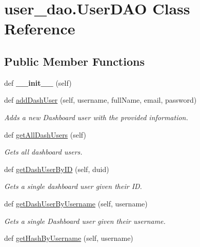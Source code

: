 \hypertarget{classuser__dao_1_1_user_d_a_o}{}\section{user\+\_\+dao.\+User\+D\+AO Class Reference}
\label{classuser__dao_1_1_user_d_a_o}
\subsection*{Public Member Functions}
\begin{DoxyCompactItemize}
\item 
\mbox{\label{classuser__dao_1_1_user_d_a_o_a397ae57cda51485064c7e5012218e627}} 
def {\bfseries \+\_\+\+\_\+init\+\_\+\+\_\+} (self)
\item 
def \hyperlink{classuser__dao_1_1_user_d_a_o_ac46cd5c48a42131a7ab09013cbde9faa}{add\+Dash\+User} (self, username, full\+Name, email, password)
\begin{DoxyCompactList}\small\item\em Adds a new Dashboard user with the provided information. \end{DoxyCompactList}\item 
def \hyperlink{classuser__dao_1_1_user_d_a_o_a5842379bfb8cf679cb14fb8020943ebc}{get\+All\+Dash\+Users} (self)
\begin{DoxyCompactList}\small\item\em Gets all dashboard users. \end{DoxyCompactList}\item 
def \hyperlink{classuser__dao_1_1_user_d_a_o_abbf8f6a400b633f33458b768db09c60d}{get\+Dash\+User\+By\+ID} (self, duid)
\begin{DoxyCompactList}\small\item\em Gets a single dashboard user given their ID. \end{DoxyCompactList}\item 
def \hyperlink{classuser__dao_1_1_user_d_a_o_a3abc98ad63b7c8ff6fdc5e9c09e76349}{get\+Dash\+User\+By\+Username} (self, username)
\begin{DoxyCompactList}\small\item\em Gets a single Dashboard user given their username. \end{DoxyCompactList}\item 
def \hyperlink{classuser__dao_1_1_user_d_a_o_a8a4332995e7b097e3c992dfb38b5921c}{get\+Hash\+By\+Username} (self, username)

\end{DoxyCompactItemize}
